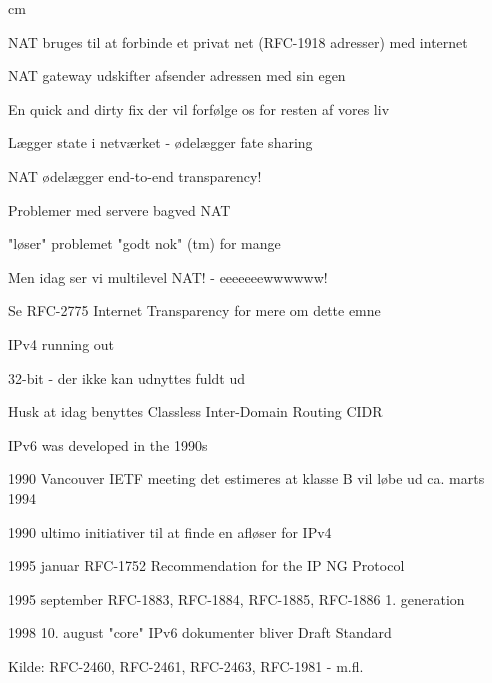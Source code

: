 \documentclass[Screen16to9,17pt]{foils}
\begin{document}
 cm
\begin{list2}
\item NAT bruges til at forbinde et privat net (RFC-1918 adresser) med internet
\item NAT gateway udskifter afsender adressen med sin egen
\item En quick and dirty fix der vil forfølge os for resten af vores
  liv
\item Lægger state i netværket - ødelægger fate sharing
\end{list2}



\begin{list2}
\item NAT ødelægger end-to-end transparency!
\item Problemer med servere bagved NAT
\item "løser" problemet "godt nok" (tm) for mange
\item Men idag ser vi multilevel NAT! - eeeeeeewwwwww!
\item Se RFC-2775 Internet Transparency for mere om dette emne
\end{list2}



\begin{list1}
\item IPv4 running out
\item 32-bit - der ikke kan udnyttes fuldt ud
\item Husk at idag benyttes Classless Inter-Domain Routing CIDR\\
\item IPv6 was developed in the 1990s
\end{list1}


\begin{list2}
\item 1990 Vancouver IETF meeting
det estimeres at klasse B vil løbe ud ca. marts 1994

\item 1990 ultimo
initiativer til at finde en afløser for IPv4

\item 1995 januar
RFC-1752 Recommendation for the IP NG Protocol

\item 1995 september
RFC-1883, RFC-1884, RFC-1885, RFC-1886 1. generation

\item 1998 10. august
"core" IPv6 dokumenter bliver Draft Standard
\item
Kilde: RFC-2460, RFC-2461, RFC-2463, RFC-1981 - m.fl.
\end{list2}
\end{document}
